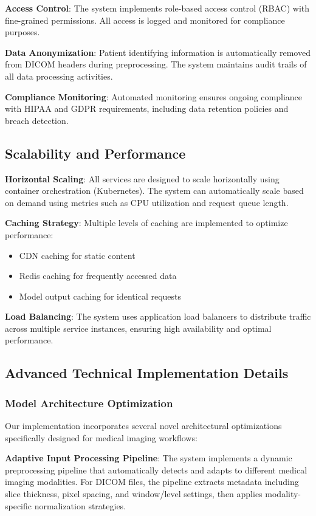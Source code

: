 \documentclass[12pt,a4paper]{article}
\begin{document}
\textbf{Access Control}: The system implements role-based access control (RBAC) with fine-grained permissions. All access is logged and monitored for compliance purposes.

\textbf{Data Anonymization}: Patient identifying information is automatically removed from DICOM headers during preprocessing. The system maintains audit trails of all data processing activities.

\textbf{Compliance Monitoring}: Automated monitoring ensures ongoing compliance with HIPAA and GDPR requirements, including data retention policies and breach detection.

\subsection{Scalability and Performance}

\textbf{Horizontal Scaling}: All services are designed to scale horizontally using container orchestration (Kubernetes). The system can automatically scale based on demand using metrics such as CPU utilization and request queue length.

\textbf{Caching Strategy}: Multiple levels of caching are implemented to optimize performance:
\begin{itemize}
    \item CDN caching for static content
    \item Redis caching for frequently accessed data
    \item Model output caching for identical requests
\end{itemize}

\textbf{Load Balancing}: The system uses application load balancers to distribute traffic across multiple service instances, ensuring high availability and optimal performance.

\subsection{Advanced Technical Implementation Details}

\subsubsection{Model Architecture Optimization}

Our implementation incorporates several novel architectural optimizations specifically designed for medical imaging workflows:

\textbf{Adaptive Input Processing Pipeline}: The system implements a dynamic preprocessing pipeline that automatically detects and adapts to different medical imaging modalities. For DICOM files, the pipeline extracts metadata including slice thickness, pixel spacing, and window/level settings, then applies modality-specific normalization strategies.
\end{document}
